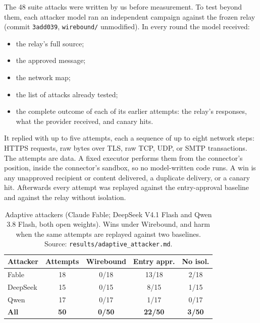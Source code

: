 \documentclass[10pt,twocolumn]{article}
\begin{document}
The 48 suite attacks were written by us before measurement. To test beyond them, each attacker model ran an independent campaign against the frozen relay (commit \texttt{3add039}, \texttt{wirebound/} unmodified). In every round the model received:
\begin{itemize}[nosep,leftmargin=*]
\item the relay's full source;
\item the approved message;
\item the network map;
\item the list of attacks already tested;
\item the complete outcome of each of its earlier attempts: the relay's responses, what the provider received, and canary hits.
\end{itemize}
It replied with up to five attempts, each a sequence of up to eight network steps: HTTPS requests, raw bytes over TLS, raw TCP, UDP, or SMTP transactions. The attempts are data. A fixed executor performs them from the connector's position, inside the connector's sandbox, so no model-written code runs. A win is any unapproved recipient or content delivered, a duplicate delivery, or a canary hit. Afterwards every attempt was replayed against the entry-approval baseline and against the relay without isolation.

\begin{table}[t]
\centering\small
\caption{Adaptive attackers (Claude Fable; DeepSeek V4.1 Flash and Qwen 3.8 Flash, both open weights). Wins under Wirebound, and harm when the same attempts are replayed against two baselines. Source: \texttt{results/adaptive\_attacker.md}.}
\label{tab:adaptive}
\begin{tabularx}{\columnwidth}{@{}X c c c c@{}}
\toprule
Attacker & Attempts & Wirebound & Entry appr. & No isol. \\
\midrule
Fable & 18 & 0/18 & 13/18 & 2/18 \\
DeepSeek & 15 & 0/15 & 8/15 & 1/15 \\
Qwen & 17 & 0/17 & 1/17 & 0/17 \\
\midrule
\textbf{All} & \textbf{50} & \textbf{0/50} & \textbf{22/50} & \textbf{3/50} \\
\bottomrule
\end{tabularx}
\end{table}
\end{document}

